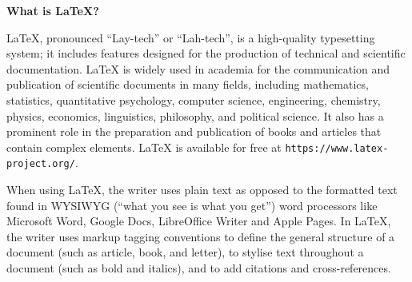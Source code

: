 \documentclass[12pt]{article}
\begin{document}
\thispagestyle{empty}

\vspace*{6.5cm}

{\Huge \textbf{What is LaTeX?}}

\vspace{1em}

\noindent
\begin{minipage}{0.98\textwidth}
\large
LaTeX, pronounced ``Lay-tech'' or ``Lah-tech'', is a high-quality typesetting system; it includes features designed for the production of technical and scientific documentation. LaTeX is widely used in academia for the communication and publication of scientific documents in many fields, including mathematics, statistics, quantitative psychology, computer science, engineering, chemistry, physics, economics, linguistics, philosophy, and political science. It also has a prominent role in the preparation and publication of books and articles that contain complex elements. LaTeX is available for free at \texttt{https://www.latex-project.org/}.

\vspace{1em}
When using LaTeX, the writer uses plain text as opposed to the formatted text found in WYSIWYG (``what you see is what you get'') word processors like Microsoft Word, Google Docs, LibreOffice Writer and Apple Pages. In LaTeX, the writer uses markup tagging conventions to define the general structure of a document (such as article, book, and letter), to stylise text throughout a document (such as bold and italics), and to add citations and cross-references.
\end{minipage}
\end{document}
